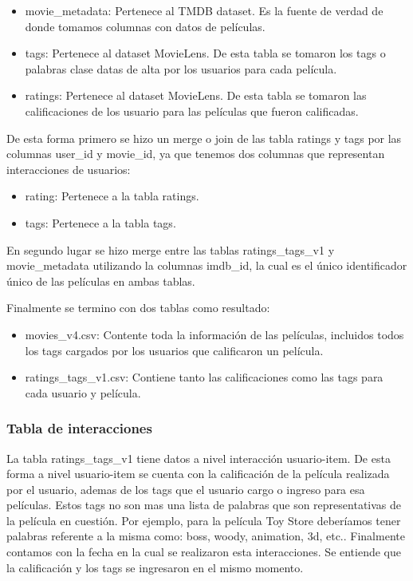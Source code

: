\documentclass[11pt,a4paper,twoside]{thesis}
\begin{document}
\begin{itemize}
	\item movie\_metadata: Pertenece al TMDB dataset. Es la fuente de verdad de donde tomamos columnas con datos de películas.
	\item tags: Pertenece al dataset MovieLens. De esta tabla se tomaron los tags o palabras clase datas de alta por los usuarios para cada película.
	\item ratings: Pertenece al dataset MovieLens. De esta tabla se tomaron las calificaciones de los usuario para las películas que fueron calificadas.
\end{itemize}

De esta forma primero se hizo un merge o join de las tabla ratings y tags por las columnas user\_id y movie\_id,
 ya que tenemos dos columnas que representan interacciones de usuarios: 

\begin{itemize}
	\item rating: Pertenece a la tabla ratings.
	\item tags: Pertenece a la tabla tags.
\end{itemize}

En segundo lugar se hizo merge entre las tablas ratings\_tags\_v1 y movie\_metadata utilizando la columnas imdb\_id, la cual es el único 
identificador único de las películas en ambas tablas.

Finalmente se termino con dos tablas como resultado:

\begin{itemize}
	\item movies\_v4.csv: Contente toda la información de las películas, incluidos todos los tags cargados por los usuarios que calificaron un película.
	\item ratings\_tags\_v1.csv: Contiene tanto las calificaciones como las tags para cada usuario y película. 
\end{itemize}

\subsubsection*{Tabla de interacciones}

La tabla ratings\_tags\_v1 tiene datos a nivel interacción usuario-item. De esta forma a nivel usuario-item se cuenta con la 
calificación de la película realizada por el usuario, ademas de los tags que el usuario cargo o ingreso para 
esa películas. Estos tags no son mas una lista de palabras que son representativas de la película en cuestión. 
Por ejemplo, para la película Toy Store deberíamos tener palabras referente a la misma como: boss, woody, 
animation, 3d, etc.. Finalmente contamos con la fecha en la cual se realizaron esta interacciones. Se entiende 
que la calificación y los tags se ingresaron en el mismo momento.
\end{document}
